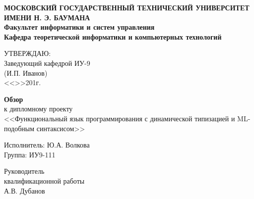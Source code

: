 \pgfplotsset{compat=1.8}

\thispagestyle{empty}
\newpage
{
\centering


\textbf{
МОСКОВСКИЙ ГОСУДАРСТВЕННЫЙ ТЕХНИЧЕСКИЙ УНИВЕРСИТЕТ ИМЕНИ Н. Э. БАУМАНА \\
Факультет информатики и систем управления \\
Кафедра теоретической информатики и компьютерных технологий}

\vfill

\hfill\parbox{7cm} {
УТВЕРЖДАЮ:\\
Заведующий кафедрой ИУ-9 \hfill \\
\underline{\hspace{4cm}}(И.П. Иванов)\hfill \\
<<\underline{\hspace{0.5cm}}>>\underline{\hspace{3cm}}201\underline{\hspace{0.5cm}}г.\hfill \\
}

\bigskip
\bigskip
\bigskip
\bigskip
\bigskip
\bigskip
\bigskip
\bigskip

\vfill

{\large\bf Обзор} \\
к дипломному проекту \\
<<Функциональный язык программирования с динамической типизацией и ML-подобным синтаксисом>>

\vfill

\hfill\parbox{7cm} {
Исполнитель: Ю.А. Волкова \\
Группа: ИУ9-111
}

\bigskip
\bigskip
\bigskip
\bigskip
\bigskip
\bigskip
\bigskip

\vfill

Руководитель \\
квалификационной работы \\
А.В. Дубанов

\vspace{\fill}
}

\clearpage